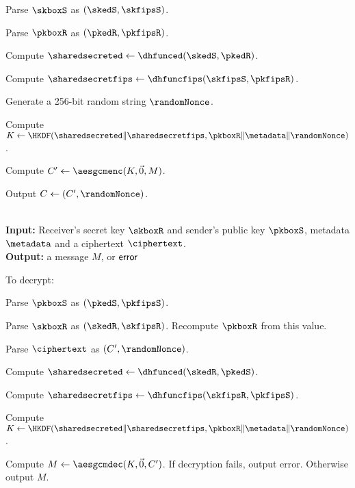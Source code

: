 \vspace{-1.5em}
\begingroup
\RaggedRight
\begin{enumerate*}
\item Parse $\skboxS$ as $(\skedS, \skfipsS)$.
\item Parse $\pkboxR$ as $(\pkedR, \pkfipsR)$.
\item Compute $\sharedsecreted \leftarrow \dhfunced(\skedS,\pkedR)$.
\item Compute $\sharedsecretfips \leftarrow \dhfuncfips(\skfipsS, \pkfipsR)$.
\item Generate a 256-bit random string $\randomNonce$.
\item Compute $K \leftarrow \HKDF(\sharedsecreted \| \sharedsecretfips, \pkboxR \|  \allowbreak \metadata \| \randomNonce)$.
\item Compute $C' \leftarrow \aesgcmenc(K, \vec{0}, M)$.
\item Output $C \leftarrow (C', \randomNonce)$.
\end{enumerate*}
\endgroup


{\underline {\bf \cboxdecrypt}} \\
{\bf Input:} Receiver's secret key $\skboxR$ and sender's public key $\pkboxS$, metadata $\metadata$ and a ciphertext $\ciphertext$. \\
{\bf Output:} a message $M$, or ${\sf error}$

To decrypt:

\vspace{-1em}
\begingroup
\RaggedRight
\begin{enumerate*}
\item Parse $\pkboxS$ as $(\pkedS, \pkfipsS)$.
\item Parse $\skboxR$ as $(\skedR, \skfipsR)$. Recompute $\pkboxR$ from this value.
\item Parse $\ciphertext$ as $(C', \randomNonce)$.
\item Compute $\sharedsecreted \leftarrow \dhfunced(\skedR,\pkedS)$.
\item Compute $\sharedsecretfips \leftarrow \dhfuncfips(\skfipsR, \pkfipsS)$.
\item Compute $K \leftarrow \HKDF(\sharedsecreted \| \sharedsecretfips, \pkboxR \| \allowbreak \metadata \| \randomNonce)$.
\item Compute $M \leftarrow \aesgcmdec(K, \vec{0}, C')$. If decryption fails, output {\sf error}. Otherwise output $M$.
\end{enumerate*}
\endgroup


